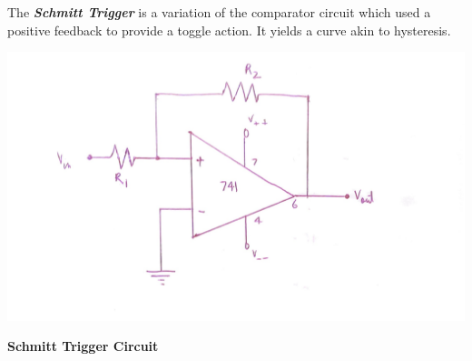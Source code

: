 \noindent The \textbf{\emph{Schmitt Trigger}} is a variation of the comparator circuit which used a positive feedback to provide a toggle action. It yields a curve akin to hysteresis.
\clearpage
\begin{center}
    \includegraphics[scale = 0.21]{OPAMP Apps/1614500891766.jpg}
\end{center}
\begin{center}
    \textbf{Schmitt Trigger Circuit}
\end{center}

